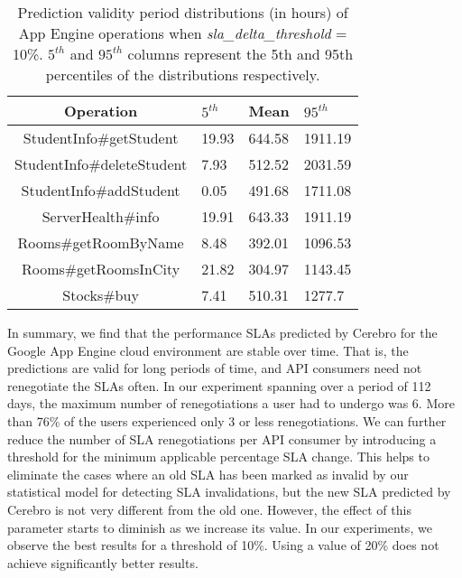 \begin{table}
\begin{center}
\begin{tabular}{|c|p{1cm}|p{1cm}|p{1cm}|}
\hline
Operation & $5^{th}$ & Mean & $95^{th}$ \\ \hline
StudentInfo\#getStudent & 19.93 & 644.58 & 1911.19 \\ \hline
StudentInfo\#deleteStudent & 7.93 & 512.52 & 2031.59 \\ \hline
StudentInfo\#addStudent & 0.05 & 491.68 & 1711.08 \\ \hline
ServerHealth\#info & 19.91 & 643.33 & 1911.19 \\ \hline
Rooms\#getRoomByName & 8.48 & 392.01 & 1096.53 \\ \hline
Rooms\#getRoomsInCity & 21.82 & 304.97 & 1143.45 \\ \hline
Stocks\#buy & 7.41 & 510.31 & 1277.7 \\ \hline
\end{tabular}
\end{center}
\caption{Prediction validity period distributions (in hours) of App Engine operations
when \textit{sla\_delta\_threshold} = 10\%. $5^{th}$ and $95^{th}$ 
columns represent the 5th and 95th percentiles of the
distributions respectively. 
\label{tab:validity_periods_sd10}
}
\vspace{-0.3in}
\end{table}


In summary, we find that the performance SLAs predicted by Cerebro 
for the Google App Engine cloud environment are stable over time. That is, the predictions are 
valid for long periods of time, and API consumers need not renegotiate the SLAs 
often. In our experiment spanning over a period of 112
days, the maximum number of renegotiations a user had to undergo was 6. More than 76\% of
the users experienced only 3 or less renegotiations. We can further reduce the number of 
SLA renegotiations per API consumer by introducing a threshold for the minimum applicable
percentage SLA change. This helps to eliminate the cases where an old SLA has been marked as invalid
by our statistical model for detecting SLA invalidations, but the new SLA predicted by Cerebro is not
very different from the old one. However, the effect of this parameter starts to diminish as we
increase its value. In our experiments, we observe the best results for a threshold of
10\%. Using a value of 20\% does not achieve significantly better results.
